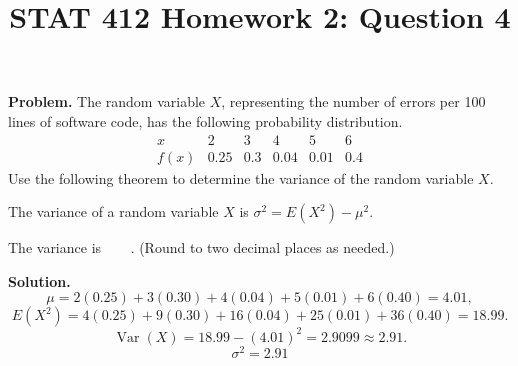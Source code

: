 \documentclass[11pt]{article}
\title{STAT 412 Homework 2: Question 4}
\author{}
\date{}
\begin{document}
\maketitle
\textbf{Problem.} The random variable \(X\), representing the number of errors
per 100 lines of software code, has the following probability distribution.
\[
\begin{array}{c|ccccc}x&2&3&4&5&6\\\hline
f(x)&0.25&0.3&0.04&0.01&0.4\end{array}
\]
Use the following theorem to determine the variance of the random variable \(X\).

The variance of a random variable \(X\) is
\(\sigma^2=E(X^2)-\mu^2\).

The variance is \(\boxed{\phantom{0.00}}\). (Round to two decimal places as
needed.)

\textbf{Solution.}
\[
\mu=2(0.25)+3(0.30)+4(0.04)+5(0.01)+6(0.40)=4.01,
\]
\[
E(X^2)=4(0.25)+9(0.30)+16(0.04)+25(0.01)+36(0.40)=18.99.
\]
\[
\operatorname{Var}(X)=18.99-(4.01)^2=2.9099\approx2.91.
\]
\[
\boxed{\sigma^2=2.91}
\]
\end{document}
